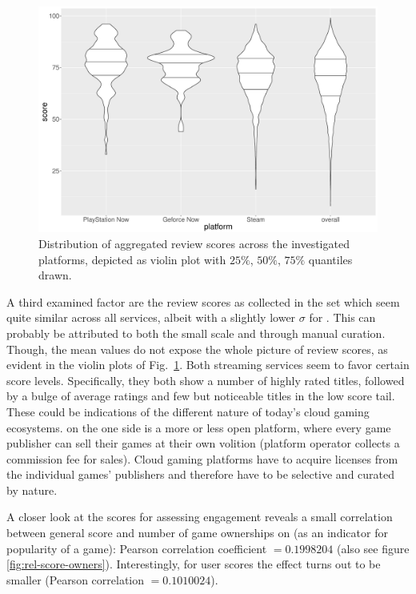 \begin{figure}[!t]
	\centering
	\includegraphics[width=1.0\columnwidth]{images/scores-by-platform-violin.pdf}
	\caption{Distribution of aggregated review scores across the investigated platforms, depicted as violin plot with $25\%$, $50\%$, $75\%$ quantiles drawn.}
\label{fig:scores-by-platform}
\end{figure}

A third examined factor are the review scores as collected in the \metacritic set which seem quite similar across all services, albeit with a slightly lower $\sigma$ for \gfnow. This can probably be attributed to both the small scale and through manual curation. Though, the mean values do not expose the whole picture of review scores, as evident in the violin plots of Fig.~\ref{fig:scores-by-platform}. Both streaming services seem to favor certain score levels. Specifically, they both show a number of highly rated titles, followed by a bulge of average ratings and few but noticeable titles in the low score tail. These could be indications of the different nature of today's cloud gaming ecosystems. \steam on the one side is a more or less open platform, where every game publisher can sell their games at their own volition (platform operator collects a commission fee for sales). Cloud gaming platforms have to acquire licenses from the individual games' publishers and therefore have to be selective and curated by nature. 

A closer look at the \metacritic scores for assessing engagement reveals a small correlation between general score and number of game ownerships on \steam (as an indicator for popularity of a game): Pearson correlation coefficient $= 0.1998204$ (also see figure \ref{fig:rel-score-owners}). Interestingly, for \metacritic user scores the effect turns out to be smaller (Pearson correlation $= 0.1010024$). 

